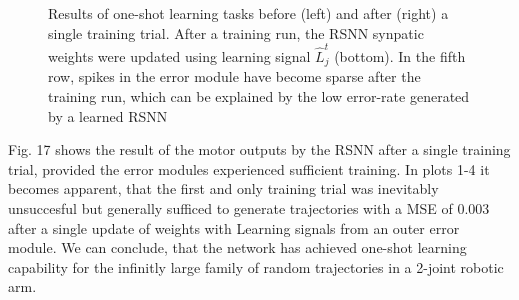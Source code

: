 \documentclass[letterpaper, 10 pt, conference]{ieeeconf}  %
\begin{document}
\begin{figure}[thpb]
        \centering
\caption{Results of one-shot learning tasks before (left) and after (right) a single training trial. After a training run, the RSNN 
synpatic weights were updated using learning signal $\hat{L}^t_j$ (bottom). In the fifth row, spikes in the error module have become sparse after
the training run, which can be explained by the low error-rate generated by a learned RSNN \cite{bellecBiologicallyInspiredAlternatives2019}}
        \label{figurelabel}
        \end{figure}

Fig. 17 shows the result of the motor outputs by the RSNN after a single training trial, provided the error modules experienced sufficient training.
In plots 1-4 it becomes apparent, that the first and only training trial was inevitably unsuccesful but generally sufficed to generate trajectories
 with a MSE of 0.003 after a single update of weights with Learning signals from an outer error module. We can 
conclude, that the network has achieved one-shot learning capability for the infinitly large family of random trajectories in a 2-joint robotic arm.
\end{document}
